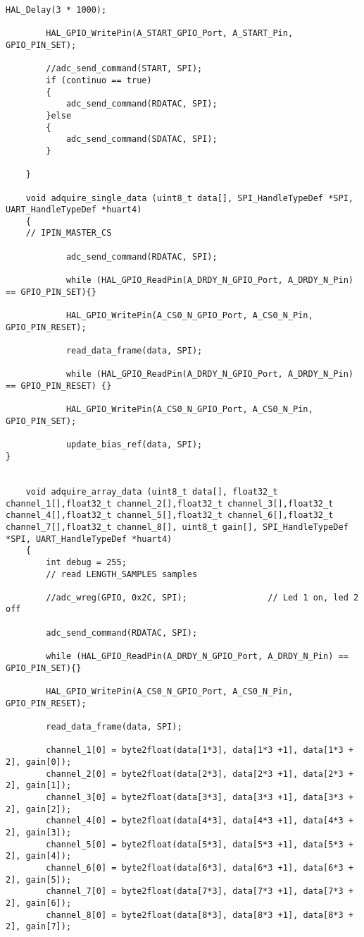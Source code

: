 \begin{lstlisting}[label=algoritmo:STM32F4:ADS1299.c,style = STM-code,frame=single,caption=STM32F4:ADS1299.c]
		HAL_Delay(3 * 1000);
		
		HAL_GPIO_WritePin(A_START_GPIO_Port, A_START_Pin, GPIO_PIN_SET);
		
		//adc_send_command(START, SPI);
		if (continuo == true)
		{
			adc_send_command(RDATAC, SPI);
		}else
		{
			adc_send_command(SDATAC, SPI);
		}
		
	}
	
	void adquire_single_data (uint8_t data[], SPI_HandleTypeDef *SPI, UART_HandleTypeDef *huart4)
	{
	// IPIN_MASTER_CS	

			adc_send_command(RDATAC, SPI);
		
			while (HAL_GPIO_ReadPin(A_DRDY_N_GPIO_Port, A_DRDY_N_Pin) == GPIO_PIN_SET){}
		
			HAL_GPIO_WritePin(A_CS0_N_GPIO_Port, A_CS0_N_Pin, GPIO_PIN_RESET);
				
			read_data_frame(data, SPI);
			
			while (HAL_GPIO_ReadPin(A_DRDY_N_GPIO_Port, A_DRDY_N_Pin) == GPIO_PIN_RESET) {}
				
			HAL_GPIO_WritePin(A_CS0_N_GPIO_Port, A_CS0_N_Pin, GPIO_PIN_SET);

			update_bias_ref(data, SPI);
}
		
	
	void adquire_array_data (uint8_t data[], float32_t channel_1[],float32_t channel_2[],float32_t channel_3[],float32_t channel_4[],float32_t channel_5[],float32_t channel_6[],float32_t channel_7[],float32_t channel_8[], uint8_t gain[], SPI_HandleTypeDef *SPI, UART_HandleTypeDef *huart4)
	{
		int debug = 255;
		// read LENGTH_SAMPLES samples
		
		//adc_wreg(GPIO, 0x2C, SPI);				// Led 1 on, led 2 off
		
		adc_send_command(RDATAC, SPI);
		
		while (HAL_GPIO_ReadPin(A_DRDY_N_GPIO_Port, A_DRDY_N_Pin) == GPIO_PIN_SET){}
		
		HAL_GPIO_WritePin(A_CS0_N_GPIO_Port, A_CS0_N_Pin, GPIO_PIN_RESET);
		
		read_data_frame(data, SPI);
			
		channel_1[0] = byte2float(data[1*3], data[1*3 +1], data[1*3 + 2], gain[0]);
		channel_2[0] = byte2float(data[2*3], data[2*3 +1], data[2*3 + 2], gain[1]);
		channel_3[0] = byte2float(data[3*3], data[3*3 +1], data[3*3 + 2], gain[2]);
		channel_4[0] = byte2float(data[4*3], data[4*3 +1], data[4*3 + 2], gain[3]);
		channel_5[0] = byte2float(data[5*3], data[5*3 +1], data[5*3 + 2], gain[4]);
		channel_6[0] = byte2float(data[6*3], data[6*3 +1], data[6*3 + 2], gain[5]);
		channel_7[0] = byte2float(data[7*3], data[7*3 +1], data[7*3 + 2], gain[6]);
		channel_8[0] = byte2float(data[8*3], data[8*3 +1], data[8*3 + 2], gain[7]);
			

\end{lstlisting}
